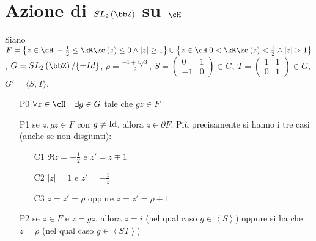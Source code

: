 
\section{Azione di $SL_2 \left( \bbZ \right)$ su $\cH$}

Siano $F=\left\{z \in \cH | -\frac{1}{2} \leq \Re(z) \leq 0
\wedge |z| \geq 1 \right\} \cup
\left\{z \in \cH | 0 < \Re(z) < \frac{1}{2} \wedge |z| > 1 \right\}$,
$G=SL_2 \left( \bbZ \right)/\{\pm Id\}$,   $\rho=\frac{-1+i\sqrt{3}}{2}$,
$S=\left( \begin{array}{cc} 0 & 1 \\ -1 & 0 \end{array} \right) \in G$,
$T=\left( \begin{array}{cc} 1 & 1 \\ 0 & 1 \end{array} \right) \in G$,
$G' = \langle S, T \rangle$.

\begin{teorema}
\begin{itemize}
\item[P0] $\forall z \in \cH \quad \exists g \in G$ tale che $gz \in F$
\item[P1] se $z,gz \in \bar{F}$ con $g \neq \text{Id}$, allora $z \in \partial F$.
  Più precisamente si hanno i tre casi (anche se non disgiunti):
  \begin{enumerate}
  \item[C1] $\Re z = \pm \frac{1}{2}$ e $z' = z \mp 1$
  \item[C2] $|z| = 1$ e $z' = - \frac{1}{z}$
  \item[C3] $z = z' = \rho$ oppure $z = z' = \rho + 1$
  \end{enumerate}
\item[P2] se $z \in F$ e $z=gz$,
  allora $z=i$ (nel qual caso $g \in \left\langle S \right\rangle$) oppure si ha che
  $z= \rho$ (nel qual caso $g \in \left\langle ST \right\rangle$)
\end{itemize}
\end{teorema}

